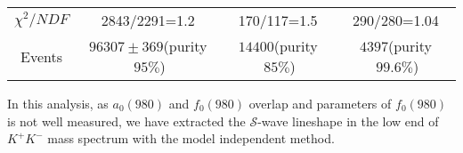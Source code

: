 {\begin{table}[htbp]
\begin{center}
\begin{tabular}{cccc}
                $\chi^{2}/NDF$                                                  & 2843/2291=1.2 & 170/117=1.5 & 290/280=1.04\\
                Events                                                         &$96307\pm369$(purity$\ 95\%$)          &$14400$(purity$\ 85\%$)  &$4397$(purity$\ 99.6\%$)\\
                \bottomrule\bottomrule
            \end{tabular}
        \end{center}
    \end{table}

    In this analysis, as $a_{0}(980)$ and $f_{0}(980)$ overlap and parameters of $f_{0}(980)$ is not well measured, 
    we have extracted the $\mathcal{S}$-wave lineshape in the low end of $K^{+}K^{-}$ mass spectrum with the model independent method.
    
}
